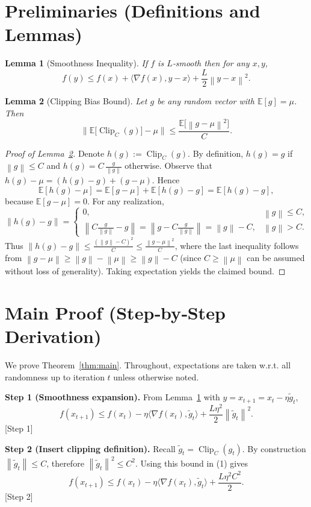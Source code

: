 \documentclass[11pt]{article}
\newtheorem{lemma}{Lemma}
\newcommand{\EE}{\mathbb{E}}
\newcommand{\norm}[1]{\left\lVert#1\right\rVert}
\begin{document}
\section*{Preliminaries (Definitions and Lemmas)}
\begin{lemma}[Smoothness Inequality]\label{lem:smooth}
If $f$ is $L$‑smooth then for any $x,y$,
\[
f(y)\le f(x)+\langle\nabla f(x),y-x\rangle+\frac{L}{2}\norm{y-x}^2 .
\]
\end{lemma}
\begin{lemma}[Clipping Bias Bound]\label{lem:clipbias}
Let $g$ be any random vector with $\EE[g]=\mu$. Then
\[
\Big\|\EE\!\big[\operatorname{Clip}_C(g)\big]-\mu\Big\|
\le \frac{\EE\big[\norm{g-\mu}^2\big]}{C}.
\]
\end{lemma}
\begin{proof}[Proof of Lemma~\ref{lem:clipbias}]
Denote $h(g):=\operatorname{Clip}_C(g)$. By definition,
$h(g)=g$ if $\norm{g}\le C$ and $h(g)=C\,\frac{g}{\norm{g}}$ otherwise.
Observe that $h(g)-\mu = (h(g)-g)+(g-\mu)$. Hence
\[
\EE[h(g)-\mu]=\EE[g-\mu]+\EE[h(g)-g]=\EE[h(g)-g],
\]
because $\EE[g-\mu]=0$.
For any realization,
\[
\norm{h(g)-g}= 
\begin{cases}
0, & \norm{g}\le C,\\[2pt]
\norm{C\frac{g}{\norm{g}}-g}= \norm{g-C\frac{g}{\norm{g}}}= \norm{g}-C, & \norm{g}>C .
\end{cases}
\]
Thus $\norm{h(g)-g}\le \frac{(\norm{g}-C)^2}{C}\le\frac{\norm{g-\mu}^2}{C}$,
where the last inequality follows from $\norm{g-\mu}\ge \norm{g}-\norm{\mu}\ge \norm{g}-C$ (since $C\ge\norm{\mu}$ can be assumed without loss of generality). Taking expectation yields the claimed bound. \qedhere
\end{proof}

\section*{Main Proof (Step‑by‑Step Derivation)}
We prove Theorem~\ref{thm:main}. Throughout, expectations are taken w.r.t. all randomness up to iteration $t$ unless otherwise noted.

\noindent\textbf{Step 1 (Smoothness expansion).}  
From Lemma~\ref{lem:smooth} with $y=x_{t+1}=x_t-\eta\tilde g_t$,
\[
f(x_{t+1})\le f(x_t)-\eta\langle\nabla f(x_t),\tilde g_t\rangle
+\frac{L\eta^2}{2}\norm{\tilde g_t}^2 .
\tag{1}
\] \hfill[Step 1]

\noindent\textbf{Step 2 (Insert clipping definition).}  
Recall $\tilde g_t=\operatorname{Clip}_C(g_t)$. By construction $\norm{\tilde g_t}\le C$, therefore $\norm{\tilde g_t}^2\le C^2$. Using this bound in (1) gives
\[
f(x_{t+1})\le f(x_t)-\eta\langle\nabla f(x_t),\tilde g_t\rangle
+\frac{L\eta^2 C^2}{2}.
\tag{2}
\] \hfill[Step 2]
\end{document}
